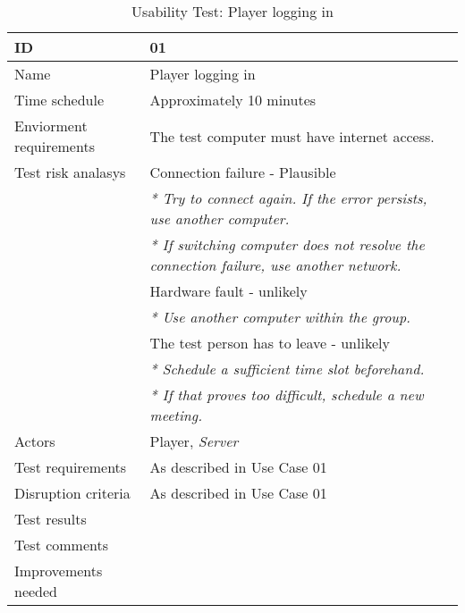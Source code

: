 
{\footnotesize
\begin{table}[H]
\begin{tabular}{| p{5cm} | p{10cm} |}\hline
	\textbf{ID}	& \textbf{01} \\ \hline
	Name		& Player logging in\\ \hline
	Time schedule	& Approximately 10 minutes\\ \hline
	Enviorment requirements 
		& The test computer must have internet access. \\ \hline
	Test risk analasys 
		& Connection failure - Plausible \\
		& \emph{* Try to connect again. If the error persists, use another computer.} \\
		& \emph{* If switching computer does not resolve the connection failure, use another network.}\\
		& Hardware fault - unlikely \\
		& \emph{* Use another computer within the group.} \\
		& The test person has to leave - unlikely \\
		& \emph{* Schedule a sufficient time slot beforehand.} \\
		& \emph{* If that proves too difficult, schedule a new meeting.}\\ \hline
	Actors	& Player, \emph{Server}\\ \hline
	Test requirements & As described in Use Case 01 \\ \hline
	Disruption criteria & As described in Use Case 01  \\ \hline
	Test results 
		& \\ \hline
	Test comments
		& \\ \hline
	Improvements needed
		& \\ \hline
\end{tabular}


\caption{Usability Test: Player logging in}
\label{fig:usability_test_1}
\end{table}}



